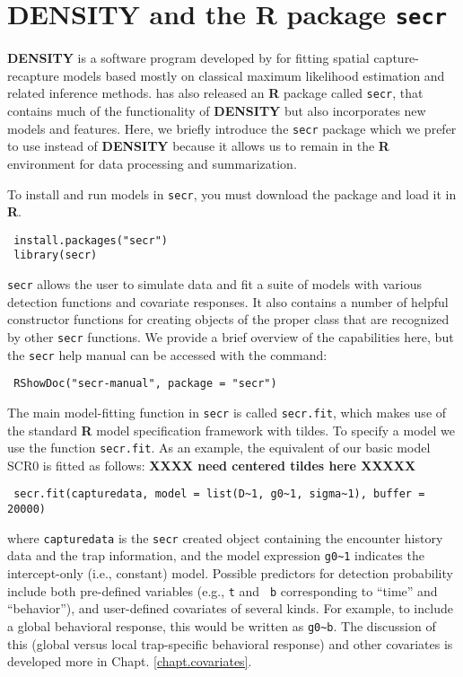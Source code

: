 \section{DENSITY and the R package \mbox{\tt secr} }
\label{mle.sec.secr}

{\bf DENSITY} is a software program developed by \citet{efford:2004}
for fitting spatial capture-recapture models based mostly on classical
maximum likelihood estimation and related inference methods.
\citet{efford:2011} has also released an {\bf R} package called
\mbox{\tt secr}, that contains much of the functionality of {\bf
  DENSITY} but also incorporates new models and features.  Here, we
briefly introduce the \mbox{\tt secr} package which we prefer to use
instead of {\bf DENSITY} because it allows us to remain in the {\bf R}
environment for data processing and summarization. 

To install
and run models in \mbox{\tt secr}, you must download the package and
load it in
{\bf R}.
\begin{verbatim}
 install.packages("secr")
 library(secr)
\end{verbatim}
\mbox{\tt secr} allows the user to simulate data and fit a suite of models with
various detection functions and covariate responses. It also contains
a number of helpful constructor functions for creating objects of the
proper class that are recognized by other \mbox{\tt secr}
functions. We provide a brief overview of the capabilities here, but
the \mbox{\tt secr} help manual can be accessed with the command:
\begin{verbatim}
 RShowDoc("secr-manual", package = "secr")
\end{verbatim}


The main model-fitting function in   \mbox{\tt secr} is called
\mbox{\tt secr.fit}, which 
makes use of the
standard {\bf R} model specification framework with tildes. To specify
a model we use the 
function \mbox{\tt secr.fit}. As an example, the equivalent of our
basic model SCR0  is fitted as follows: {\bf XXXX need centered tildes
  here XXXXX}
\begin{verbatim}
 secr.fit(capturedata, model = list(D~1, g0~1, sigma~1), buffer = 20000)
\end{verbatim}
where \mbox{\tt capturedata} is the \mbox{\tt secr} created object
containing the encounter history data and the trap information, and
the model expression \verb#g0~1# indicates the intercept-only (i.e.,
constant) model.  Possible predictors for detection probability
include both pre-defined variables (e.g., \mbox{\tt t} and \mbox{\tt
  b} corresponding to ``time'' and ``behavior''), and user-defined
covariates of several kinds.  For example, to include a global
behavioral response, this would be written as \verb#g0~b#.  The
discussion of this (global versus local trap-specific behavioral
response) and other covariates is developed more in
Chapt. \ref{chapt.covariates}.

